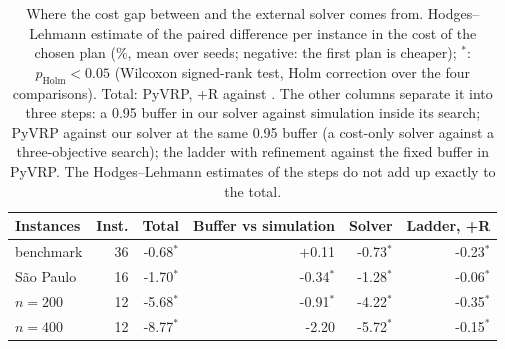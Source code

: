 \begin{table}[htbp]
\centering
\caption{Where the cost gap between \mSIM{} and the external solver comes from. Hodges--Lehmann estimate of the paired difference per instance in the cost of the chosen plan (\%, mean over seeds; negative: the first plan is cheaper); $^*$: $p_{\mathrm{Holm}}<0.05$ (Wilcoxon signed-rank test, Holm correction over the four comparisons). Total: PyVRP, \mCAL{}+R against \mSIM{}. The other columns separate it into three steps: a 0.95 buffer in our solver against simulation inside its search; PyVRP against our solver at the same 0.95 buffer (a cost-only solver against a three-objective search); the ladder with refinement against the fixed buffer in PyVRP. The Hodges--Lehmann estimates of the steps do not add up exactly to the total.}
\label{tab:pyvrp-decomp}
\small\setlength{\tabcolsep}{4pt}
\begin{tabular}{@{}l r r r r r@{}}
\toprule
Instances & Inst. & Total & Buffer vs simulation & Solver & Ladder, +R \\
\midrule
benchmark & 36 & -0.68$^*$ & +0.11 & -0.73$^*$ & -0.23$^*$ \\
S\~ao Paulo & 16 & -1.70$^*$ & -0.34$^*$ & -1.28$^*$ & -0.06$^*$ \\
$n=200$ & 12 & -5.68$^*$ & -0.91$^*$ & -4.22$^*$ & -0.35$^*$ \\
$n=400$ & 12 & -8.77$^*$ & -2.20 & -5.72$^*$ & -0.15$^*$ \\
\bottomrule
\end{tabular}
\end{table}
